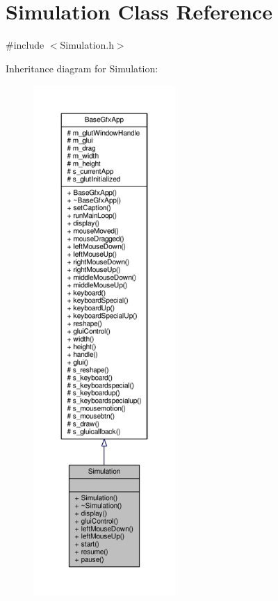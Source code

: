 \hypertarget{classSimulation}{\section{Simulation Class Reference}
\label{classSimulation}
}


{\ttfamily \#include $<$Simulation.\-h$>$}



Inheritance diagram for Simulation\-:\nopagebreak
\begin{figure}[H]
\begin{center}
\leavevmode
\includegraphics[height=550pt]{classSimulation__inherit__graph}
\end{center}
\end{figure}


